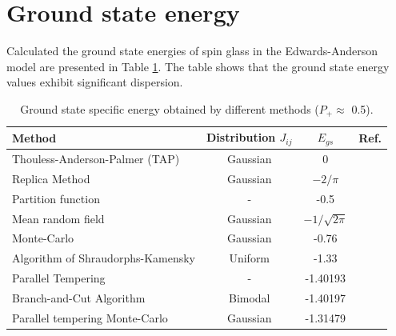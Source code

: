 \documentclass[preprint,12pt]{elsarticle}
\begin{document}
	\section{Ground state energy}
	
	Calculated the ground state energies of spin glass in the Edwards-Anderson model are presented in Table \ref{tab:Egs}. The table shows that the ground state energy values exhibit significant dispersion.
	
	\begin{table}[h]
		\begin{tabular}{|l|c|c|l|}
			\hline
			Method     &     Distribution $J_{ij}$                         &
			$E_{gs}$                                       &  Ref.                                          \\ \hline
			Thouless-Anderson-Palmer (TAP)& Gaussian &  0                                              & \cite{thouless1977solution}    \\ \hline
			Replica Method   & Gaussian                         & $-2/\pi$                                       & \cite{sherrington1975solvable} \\ \hline
			Partition function   &   -                 & -0.5                                           & \cite{tanaka1980analytic}      \\ \hline
			Mean random field  &   Gaussian  &                   $-1/\sqrt{2\pi}$                               & \cite{klein1976comparison}     \\ \hline
			Monte-Carlo      &   Gaussian    &        -0.76                                          & \cite{kirkpatrick1978infinite} \\ \hline
			Algorithm of Shraudorphs-Kamensky   &  Uniform &     -1.33                                          & \cite{karandashev2019global}   \\ \hline
			Parallel Tempering &   -       & -1.40193                                       & \cite{palmer1999ground}        \\ \hline
			Branch-and-Cut Algorithm  & Bimodal               & -1.40197                         
			& \cite{campbell2004energy}      \\ \hline
			
			Parallel tempering Monte-Carlo    &  Gaussian         & -1.31479                                       & \cite{roma2009ground}          \\ \hline
			
			
			
		\end{tabular}
		\caption{Ground state specific energy obtained by different methods ($P_+\approx$ 0.5).}
		\label{tab:Egs}
	\end{table}
	
\end{document}
